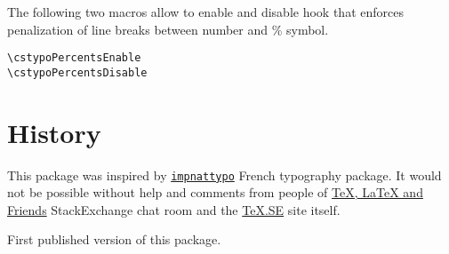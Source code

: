 \documentclass[paper=B5,DIV=calc,parskip=half]{scrartcl}
\begin{document}
The following two macros allow to enable and disable hook that enforces
penalization of line breaks between number and \% symbol.

\begin{lstlisting}[style=myLatexStyle]
\cstypoPercentsEnable
\cstypoPercentsDisable
\end{lstlisting}

\section{History}

This package was inspired by
\texttt{\href{http://www.ctan.org/pkg/impnattypo}{impnattypo}} French
typography package. It would not be possible without help and comments from
people of
\href{http://chat.stackexchange.com/rooms/41/tex-latex-and-friends}{\TeX{},
  \LaTeX{} and Friends} StackExchange chat room and the
\href{http://tex.stackexchange.com/}{\TeX.SE} site itself.

\begin{description}[style=nextline, labelwidth=4.5em, leftmargin=!, labelindent=0em]
  \item[\texttt{v0.01}] First published version of this package.
\end{description}
\end{document}
